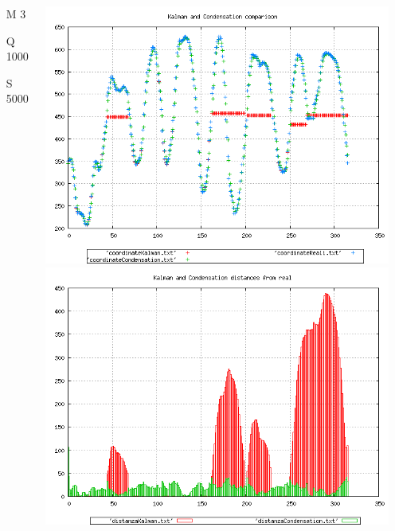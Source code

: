 {\begin{columns}
\begin{scriptsize}
\begin{itemize}
\item [M]3
\item [Q]1000
\item [S]5000
\end{itemize}
\end{scriptsize}
\includegraphics[scale=0.1]{../esperimenti/movie12/mod_3-Q_1000-S_5000/plot.png}\\
\includegraphics[scale=0.1]{../esperimenti/movie12/mod_3-Q_1000-S_5000/plot-distances.png}


\end{columns}}

